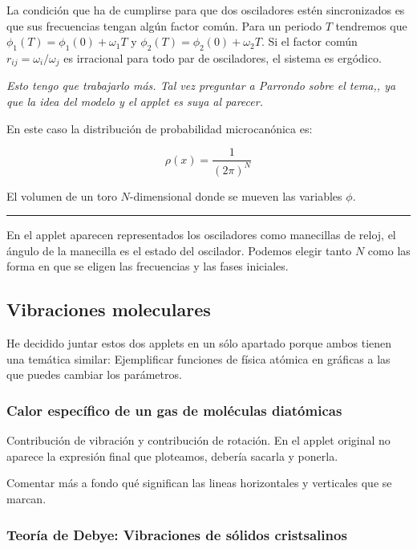 \documentclass[11pt, a4paper]{article} %
\theoremstyle{named}
\begin{document}
        La condición que ha de cumplirse para que dos osciladores estén sincronizados es que sus frecuencias tengan algún factor común. Para un periodo $T$ tendremos que $\phi_1(T) = \phi_1(0) + \omega_1 T$ y $\phi_2(T) = \phi_2(0) + \omega_2 T$. Si el factor común $r_{ij}={\omega_i}/{\omega_j}$ es irracional para todo par de osciladores, el sistema es ergódico.

        \textit{Esto tengo que trabajarlo más.  Tal vez preguntar a Parrondo sobre el tema,, ya que la idea del modelo y el applet es suya al parecer.}

        En este caso la distribución de probabilidad microcanónica es:

        $$
        \rho (x) = \frac{1}{(2\pi)^N}
        $$

        El volumen de un toro $N$-dimensional donde se mueven las variables $\phi$.

        \noindent\rule{\linewidth}{0.4pt}

        En el applet aparecen representados los osciladores como manecillas de reloj, el ángulo de la manecilla es el estado del oscilador. Podemos elegir tanto $N$ como las forma en que se eligen las frecuencias y las fases iniciales.

    \newpage
    \subsection{Vibraciones moleculares}

        He decidido juntar estos dos applets en un sólo apartado porque ambos tienen una temática similar: Ejemplificar funciones de física atómica en gráficas a las que puedes cambiar los parámetros.

        \subsubsection{Calor específico de un gas de moléculas diatómicas}\label{sec:diatomicas}

            Contribución de vibración y contribución de rotación. En el applet original no aparece la expresión final que ploteamos, debería sacarla y ponerla.

            Comentar más a fondo qué significan las lineas horizontales y verticales que se  marcan.

        \subsubsection{Teoría de Debye: Vibraciones de sólidos cristsalinos}\label{sec:debye}
\end{document}
